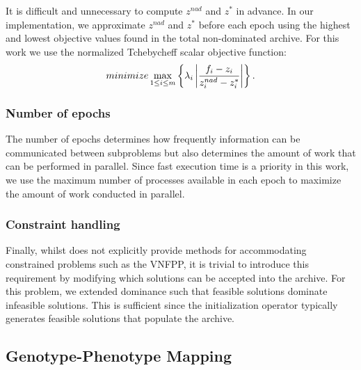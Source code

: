 It is difficult and unnecessary to compute $z^{nad}$ and $z^*$ in advance. In our implementation, we approximate $z^{nad}$ and $z^*$ before each epoch using the highest and lowest objective values found in the total non-dominated archive. For this work we use the normalized Tchebycheff scalar objective function:
\begin{equation}
    minimize  \max_{1 \leq i \leq m} \left\{\lambda_i \left\lvert \frac{f_i - z_i}{z_i^{nad} - z_i^*} \right\rvert \right\}.
\end{equation}

\subsubsection{Number of epochs}
The number of epochs determines how frequently information can be communicated between subproblems but also determines the amount of work that can be performed in parallel. Since fast execution time is a priority in this work, we use the maximum number of processes available in each epoch to maximize the amount of work conducted in parallel.
 
\subsubsection{Constraint handling}
Finally, whilst  does not explicitly provide methods for accommodating constrained problems such as the VNFPP, it is trivial to introduce this requirement by modifying which solutions can be accepted into the archive. For this problem, we extended dominance such that feasible solutions dominate infeasible solutions. This is sufficient since the initialization operator typically generates feasible solutions that populate the archive.

\subsection{Genotype-Phenotype Mapping}
\label{sec:gp_mapping}

